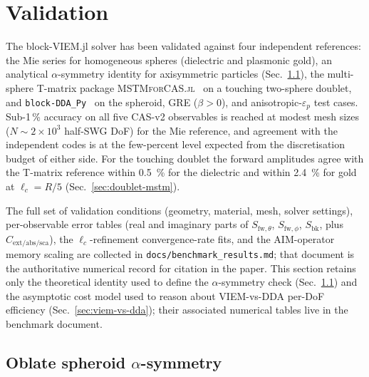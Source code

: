 \documentclass[11pt,a4paper]{article}
\begin{document}
\section{Validation}
\label{sec:validation}

The block-VIEM.jl solver has been validated against four independent
references: the Mie series for homogeneous spheres
(dielectric and plasmonic gold), an analytical $\alpha$-symmetry
identity for axisymmetric particles
(Sec.~\ref{sec:alpha-expansion}), the multi-sphere T-matrix
package \textsc{MSTMforCAS.jl}~\cite{MSTMforCAS} on a touching
two-sphere doublet, and \texttt{block-DDA\_Py}~\cite{Moteki2024} on
the spheroid, GRE ($\beta > 0$), and anisotropic-$\varepsilon_p$
test cases.  Sub-1\,\% accuracy on all five CAS-v2 observables is
reached at modest mesh sizes ($N \sim 2 \times 10^3$ half-SWG DoF)
for the Mie reference, and agreement with the independent codes is
at the few-percent level expected from the discretisation budget of
either side.  For the touching doublet the forward amplitudes agree
with the T-matrix reference within \SI{0.5}{\percent} for the
dielectric and within \SI{2.4}{\percent} for gold at
$\ell_c = R/5$ (Sec.~\ref{sec:doublet-mstm}).

The full set of validation conditions (geometry, material, mesh,
solver settings), per-observable error tables (real and imaginary
parts of $S_{\text{fw},\theta}$, $S_{\text{fw},\phi}$,
$S_{\text{bk}}$, plus $C_{\text{ext/abs/sca}}$), the
$\ell_c$-refinement convergence-rate fits, and the AIM-operator
memory scaling are collected in
\texttt{docs/benchmark\_results.md}; that document is the
authoritative numerical record for citation in the paper.  This
section retains only the theoretical identity used to define the
$\alpha$-symmetry check (Sec.~\ref{sec:alpha-expansion}) and the
asymptotic cost model used to reason about VIEM-vs-DDA per-DoF
efficiency (Sec.~\ref{sec:viem-vs-dda}); their associated numerical
tables live in the benchmark document.

\subsection{Oblate spheroid $\alpha$-symmetry}
\label{sec:alpha-expansion}
\end{document}
